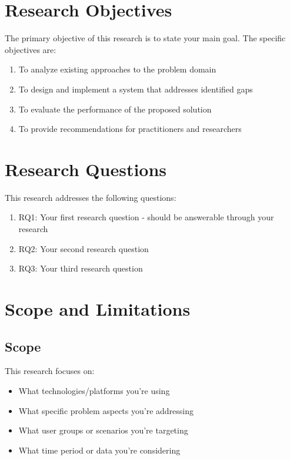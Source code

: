 \section{Research Objectives}
\label{sec:objectives}

The primary objective of this research is to state your main goal. The specific objectives are:

\begin{enumerate}
    \item To analyze existing approaches to the problem domain
    
    \item To design and implement a system that addresses identified gaps
    
    \item To evaluate the performance of the proposed solution
    
    \item To provide recommendations for practitioners and researchers
\end{enumerate}


\section{Research Questions}
\label{sec:research_questions}

This research addresses the following questions:

\begin{enumerate}
    \item RQ1: Your first research question - should be answerable through your research
    
    \item RQ2: Your second research question
    
    \item RQ3: Your third research question
\end{enumerate}


\section{Scope and Limitations}
\label{sec:scope}

\subsection{Scope}
\label{subsec:scope}

This research focuses on:
\begin{itemize}
    \item What technologies/platforms you're using
    \item What specific problem aspects you're addressing
    \item What user groups or scenarios you're targeting
    \item What time period or data you're considering
\end{itemize}

